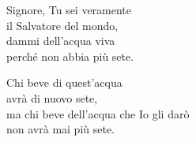 
 

\spazio

\strofa Signore, Tu sei veramente\\
il Salvatore del mondo,\\
dammi dell'acqua viva\\
perché non abbia più sete.

\spazio

 

\spazio

\strofa Chi beve di quest'acqua\\
avrà di nuovo sete,\\
ma chi beve dell'acqua che Io gli darò\\
non avrà mai più sete.

\spazio

 